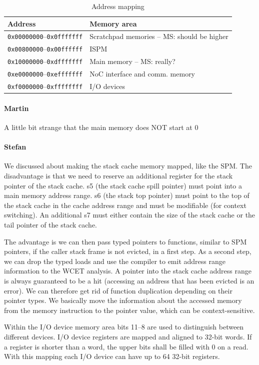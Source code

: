 \documentclass{IEEEtran}
\newcommand{\code}[1]{{\texttt{#1}}}
\newcommand{\comment}[3]{\paragraph*{\textbf{#1}}{\color{#3}#2}}
\newcommand{\martin}[1]{\comment{Martin}{#1}{Blue}}
\newcommand{\stefan}[1]{\comment{Stefan}{#1}{RoyalPurple}}
\begin{document}
\begin{table}
\centering
\begin{tabular}{ll}
\toprule
Address & Memory area \\
\midrule
\code{0x00000000}--\code{0x0fffffff} & Scratchpad memories -- MS: should be higher\\
\code{0x00800000}--\code{0x00ffffff} & ISPM \\
\code{0x10000000}--\code{0xdfffffff} & Main memory -- MS: really?\\
\code{0xe0000000}--\code{0xefffffff} & NoC interface and comm. memory\\
\code{0xf0000000}--\code{0xffffffff} & I/O devices \\
\bottomrule
\end{tabular}
\caption{Address mapping}
\label{tab:mmap}
\end{table}

\martin{A little bit strange that the main memory does NOT start at 0}

\stefan{We discussed about making the stack cache memory mapped, like the SPM. The disadvantage is that 
we need to reserve an additional register for the stack pointer of the stack cache. s5 (the stack cache spill pointer) must point into a main 
memory address range. s6 (the stack top pointer) must point to the top of the stack cache in the cache address range and must be modifiable
(for context switching). An additional s7 must either contain the size of the stack cache or the tail pointer of the stack cache. 

The advantage is we can then pass typed pointers to functions, similar to SPM pointers, if the caller stack frame is not evicted, in a first
step. As a second step, we can drop the typed loads and use the compiler to emit address range information to the WCET analysis. 
A pointer into the stack cache address range is always guaranteed to be a hit (accessing an address that has been evicted is an error). We
can therefore get rid of function duplication depending on their pointer types. We basically move the information about the accessed memory from the
memory instruction to the pointer value, which can be context-sensitive.}




Within the I/O device memory area bits 11--8 are used to distinguish between different devices.
I/O device registers are mapped and aligned to 32-bit words. If a register is shorter than a word,
the upper bits shall be filled with 0 on a read. With this mapping each I/O device can have up to
64 32-bit registers.
\end{document}
